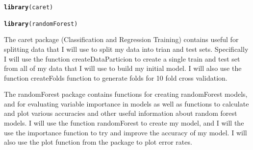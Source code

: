 \documentclass{article}\usepackage[]{graphicx}\usepackage[]{color}
\makeatletter
\newcommand{\hlstd}[1]{\textcolor[rgb]{0.345,0.345,0.345}{#1}}%
\newcommand{\hlkwd}[1]{\textcolor[rgb]{0.737,0.353,0.396}{\textbf{#1}}}%
\newenvironment{kframe}{%
 \def\at@end@of@kframe{}%
 \ifinner\ifhmode%
  \def\at@end@of@kframe{\end{minipage}}%
  \begin{minipage}{\columnwidth}%
 \fi\fi%
 \def\FrameCommand##1{\hskip\@totalleftmargin \hskip-\fboxsep
 \colorbox{shadecolor}{##1}\hskip-\fboxsep
     \hskip-\linewidth \hskip-\@totalleftmargin \hskip\columnwidth}%
 \MakeFramed {\advance\hsize-\width
   \@totalleftmargin\z@ \linewidth\hsize
   \@setminipage}}%
 {\par\unskip\endMakeFramed%
 \at@end@of@kframe}
\newenvironment{knitrout}{}{} %
\makeatother
\begin{document}
\begin{knitrout}
\color{fgcolor}\begin{kframe}
\begin{alltt}
\hlkwd{library}\hlstd{(caret)}
\end{alltt}


{\ttfamily\noindent\color{warningcolor}{\#\# Warning: package 'caret' was built under R version 3.4.2}}

{\ttfamily\noindent\itshape\color{messagecolor}{\#\# Loading required package: lattice}}\begin{alltt}
\hlkwd{library}\hlstd{(randomForest)}
\end{alltt}


{\ttfamily\noindent\color{warningcolor}{\#\# Warning: package 'randomForest' was built under R version 3.4.2}}

{\ttfamily\noindent\itshape\color{messagecolor}{\#\# randomForest 4.6-12}}

{\ttfamily\noindent\itshape\color{messagecolor}{\#\# Type rfNews() to see new features/changes/bug fixes.}}

{\ttfamily\noindent\itshape\color{messagecolor}{\#\# \\\#\# Attaching package: 'randomForest'}}

{\ttfamily\noindent\itshape\color{messagecolor}{\#\# The following object is masked from 'package:dplyr':\\\#\# \\\#\#\ \ \ \  combine}}

{\ttfamily\noindent\itshape\color{messagecolor}{\#\# The following object is masked from 'package:ggplot2':\\\#\# \\\#\#\ \ \ \  margin}}\end{kframe}
\end{knitrout}
The caret package (Classification and Regression Training) contains useful for splitting data that I will use to split my data into trian and test sets. Specifically I will use the function createDataParticion to create a single train and test set from all of my data that I will use to build my initial model. I will also use the function createFolds function to generate folds for 10 fold cross validation. 

The randomForest package contains functions for creating randomForest models, and for evaluating variable importance in models as well as functions to calculate and plot various accuracies and other useful information about random forest models. I will use the function randomForest to create my model, and I will the use the importance function to try and improve the accuracy of my model. I will also use the plot function from the package to plot error rates. 
\end{document}
